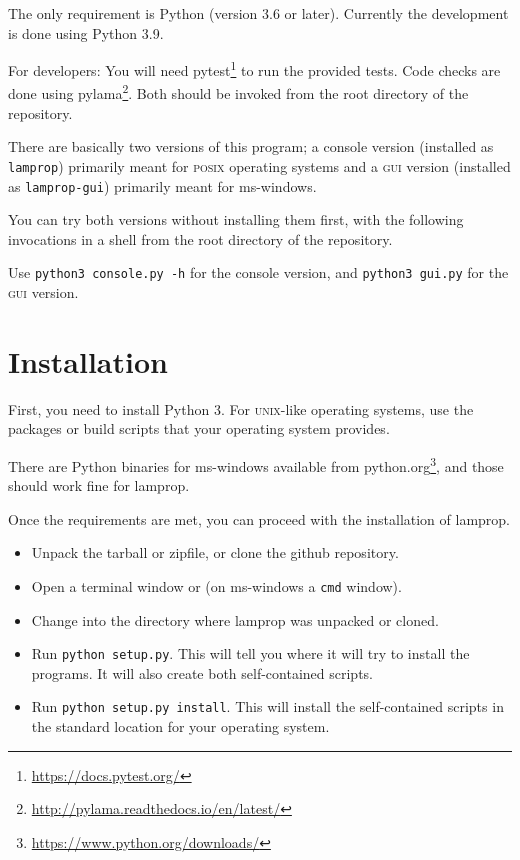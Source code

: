 \documentclass[a4paper,landscape,oneside,11pt,twocolumn]{memoir}
\begin{document}
The only requirement is Python (version 3.6 or later). Currently the
development is done using Python 3.9.

For developers: You will need pytest\footnote{\url{https://docs.pytest.org/}}
to run the provided tests. Code checks are done using
pylama\footnote{\url{http://pylama.readthedocs.io/en/latest/}}. Both should be
invoked from the root directory of the repository.

There are basically two versions of this program; a console version (installed
as \texttt{lamprop}) primarily meant for \textsc{posix} operating systems and
a \textsc{gui} version (installed as \texttt{lamprop-gui}) primarily meant for
ms-windows.

You can try both versions without installing them first, with the following
invocations in a shell from the root directory of the repository.

Use \texttt{python3 console.py -h} for the console version, and
\texttt{python3 gui.py} for the \textsc{gui} version.

\section{Installation} %

First, you need to install Python 3. For \textsc{unix}-like operating systems,
use the packages or build scripts that your operating system provides.

There are Python binaries for ms-windows available from
python.org\footnote{\url{https://www.python.org/downloads/}}, and those should
work fine for lamprop.

Once the requirements are met, you can proceed with the installation of lamprop.
\begin{itemize}
    \item Unpack the tarball or zipfile, or clone the github repository.
    \item Open a terminal window or (on ms-windows a \texttt{cmd} window).
    \item Change into the directory where lamprop was unpacked or cloned.
    \item Run \texttt{python setup.py}.
        This will tell you where it will try to install the programs.
        It will also create both self-contained scripts.
    \item Run \texttt{python setup.py install}. This will install the
        self-contained scripts in the standard location for your operating
        system.
\end{itemize}
\end{document}
